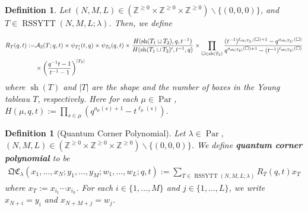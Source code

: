 \documentclass[12pt,reqno,a4paper]{amsart}
\newcommand{\cals}[1]{\mathcal{#1}}
\newcommand{\bb}[1]{\mathbb{#1}}
\numberwithin{equation}{section}
\newtheorem{dfn}[thm]{Definition}
\newcommand{\quantumcorner}{\mathfrak{QC}}
\newcommand{\quantumcornerpolynomial}{\quantumcorner_\lambda(x_1,\dots,x_{N};y_1,\dots,y_{M};w_1,\dots,w_{L};q,t)}
\theoremstyle{definition}
\begin{document}
\begin{dfn}
Let $(N,M,L) \in (\bb{Z}^{\geq 0} \times \bb{Z}^{\geq 0} \times \bb{Z}^{\geq 0})\backslash\{(0,0,0)\}$, and $T \in \operatorname{RSSYTT}(N,M,L;\lambda)$. Then, we define 

\footnotesize
\begin{align}
	R_T(q,t)
	:=&  
	\cals{A}_2(T;q,t) \times 
	\psi_{T^{\prime}_{1}}(t,q) \times \psi_{T_0}(q,t)
	\times
	\frac{
		H(\operatorname{sh}(T_1 \sqcup T_2),q,t^{-1})
	}{
		H(\operatorname{sh}(T_1 \sqcup T_2)^\prime,t^{-1},q)
	}
	\times 
	\prod_{\square \in \operatorname{sh}(T_2)}
	\frac{
		(t^{-1})^{\ell_{\operatorname{sh}(T_2)}(\square) + 1} - q^{a_{\operatorname{sh}(T_2)}(\square)}
	}{
		q^{a_{\operatorname{sh}(T_2)}(\square) + 1} - (t^{-1})^{\ell_{\operatorname{sh}(T_2)}(\square)}
	}
	\notag 
	\\
	&\times 
	\left(	\frac{q^{-1}t - 1}{t^{-1} - 1}				\right)^{|T_2|}
\end{align}
\normalsize
where $\operatorname{sh}(T)$ and 
$|T|$ are the shape and the number of boxes in the Young tableau $T$, respectively. Here for each $\mu \in \operatorname{Par}$, 
$H(\mu,q,t) := 
\prod_{s \in \mu}\left(
q^{a_{\mu}(s) + 1} - t^{\ell_\mu(s)}
\right)$. 
\end{dfn}

\begin{dfn}[Quantum Corner Polynomial]
\label{defn314-1234-25jul}
Let $\lambda \in \operatorname{Par}$, $(N,M,L) \in (\bb{Z}^{\geq 0} \times \bb{Z}^{\geq 0} \times \bb{Z}^{\geq 0})\backslash\{(0,0,0)\}$. We define \textbf{quantum corner polynomial} to be 
\begin{align}
	\quantumcornerpolynomial
	:= 
	\sum_{T \in \operatorname{RSSYTT}(N,M,L;\lambda)}
	R_T(q,t)x_T
\end{align}
where $x_T := x_{i_1}\cdots x_{i_k}$. For each $i \in \{1,\dots,M\}$ and $j \in \{1,\dots,L\}$, we write $x_{N+i} = y_i$ and $x_{N+M+j} = w_j$. 
\end{dfn}
\end{document}
